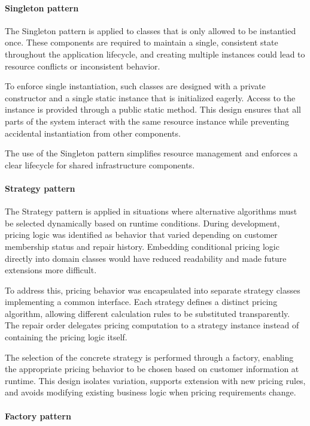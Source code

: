 \documentclass[a4paper]{scrartcl}
\begin{document}
\paragraph{Singleton pattern}

The Singleton pattern is applied to classes that is only allowed to be instantied once. These components are required to maintain a single, consistent state throughout the application lifecycle, and creating multiple instances could lead to resource conflicts or inconsistent behavior.

To enforce single instantiation, such classes are designed with a private constructor and a single static instance that is initialized eagerly. Access to the instance is provided through a public static method. This design ensures that all parts of the system interact with the same resource instance while preventing accidental instantiation from other components.

The use of the Singleton pattern simplifies resource management and enforces a clear lifecycle for shared infrastructure components.

\paragraph{Strategy pattern}

The Strategy pattern is applied in situations where alternative algorithms must be selected dynamically based on runtime conditions. During development, pricing logic was identified as behavior that varied depending on customer membership status and repair history. Embedding conditional pricing logic directly into domain classes would have reduced readability and made future extensions more difficult.

To address this, pricing behavior was encapsulated into separate strategy classes implementing a common interface. Each strategy defines a distinct pricing algorithm, allowing different calculation rules to be substituted transparently. The repair order delegates pricing computation to a strategy instance instead of containing the pricing logic itself.

The selection of the concrete strategy is performed through a factory, enabling the appropriate pricing behavior to be chosen based on customer information at runtime. This design isolates variation, supports extension with new pricing rules, and avoids modifying existing business logic when pricing requirements change.

\paragraph{Factory pattern}
\end{document}
